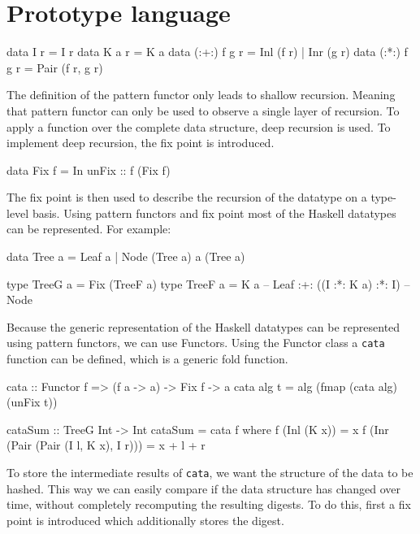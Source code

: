 \section{Prototype language}
\begin{haskell}
data I r         = I r                  
data K a r       = K a                  
data (:+:) f g r = Inl (f r) | Inr (g r)
data (:*:) f g r = Pair (f r, g r)
\end{haskell}

The definition of the pattern functor only leads to shallow recursion. Meaning that pattern functor can only be used to observe a single layer of recursion. To apply a function over the complete data structure, deep recursion is used. To implement deep recursion, the fix point is introduced.

\begin{haskell}
data Fix f = In { unFix :: f (Fix f) }
\end{haskell}

The fix point is then used to describe the recursion of the datatype on a type-level basis. Using pattern functors and fix point most of the Haskell datatypes can be represented. For example:

\begin{haskell}
data Tree a = Leaf a
            | Node (Tree a) a (Tree a)

type TreeG a = Fix (TreeF a)
type TreeF a = K a                  -- Leaf
            :+: ((I :*: K a) :*: I) -- Node
\end{haskell}

Because the generic representation of the Haskell datatypes can be represented using pattern functors, we can use Functors. Using the Functor class a \texttt{cata} function can be defined, which is a generic fold function.

\begin{haskell}
cata :: Functor f => (f a -> a) -> Fix f -> a
cata alg t = alg (fmap (cata alg) (unFix t))
\end{haskell}

\begin{haskell}
cataSum :: TreeG Int -> Int
cataSum = cata f
  where
    f (Inl (K x))                         = x
    f (Inr (Pair (Pair (I l, K x), I r))) = x + l + r
\end{haskell}

To store the intermediate results of \texttt{cata}, we want the structure of the data to be hashed. This way we can easily compare if the data structure has changed over time, without completely recomputing the resulting digests. To do this, first a fix point is introduced which additionally stores the digest.

